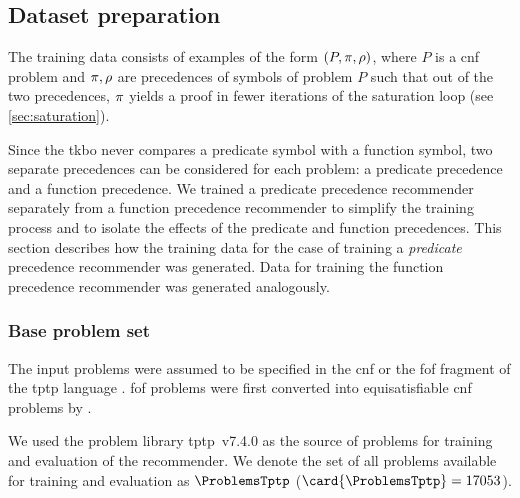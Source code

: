 
\subsection{Dataset preparation}

The training data consists of examples of the form $(P, \pi, \rho)$,
where $P$ is a \gls{cnf} problem and $\pi, \rho$ are precedences of symbols of problem $P$
such that out of the two precedences, $\pi$ yields a proof in fewer iterations of the saturation loop (see \cref{sec:saturation}).

Since the \gls{tkbo} never compares a predicate symbol with a function symbol,
two separate precedences can be considered for each problem:
a predicate precedence and a function precedence.
We trained a predicate precedence recommender separately from a function precedence recommender
to simplify the training process and to isolate the effects of the predicate and function precedences.
This section describes how the training data for the case of training a \emph{predicate} precedence recommender was generated.
Data for training the function precedence recommender was generated analogously.

\subsubsection{Base problem set}

The input problems were assumed to be specified in the \gls{cnf} or the \gls{fof} fragment
of the \acrshort{tptp} language \cite{Sutcliffe2017}.
\Gls{fof} problems were first converted into equisatisfiable \gls{cnf} problems by \Vampire{}.

We used the problem library \acrshort{tptp}~v7.4.0 \cite{Sutcliffe2017}
as the source of problems for training and evaluation of the recommender.
We denote the set of all problems available for training and evaluation as $\ProblemsTptp$ ($\card{\ProblemsTptp} = 17053$).

